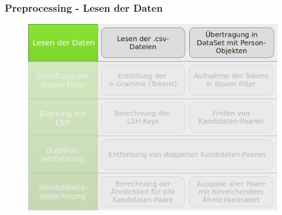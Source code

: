 \documentclass{beamer}
\begin{document}
    \begin{frame}
    		\frametitle{Preprocessing - Lesen der Daten}
    		\begin{figure}[H]
    			\includegraphics[width=\textwidth]{graphics/process_1.png}
    		\end{figure}
    \end{frame}
    
\end{document}
